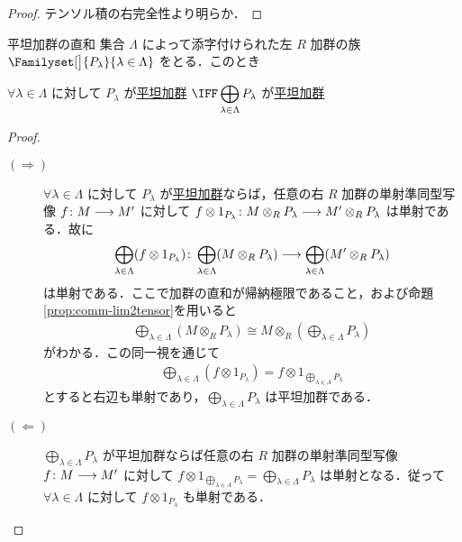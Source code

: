 \documentclass[algtopo_main]{subfiles}
\begin{document}
\begin{proof}
    テンソル積の右完全性より明らか．
\end{proof}


\begin{myprop}[label=prop:flat-mod-ds]{平坦加群の直和}
    集合 $\Lambda$ によって添字付けられた左 $R$ 加群の族 $\Familyset[\big]{P_\lambda}{\lambda \in \Lambda}$ をとる．このとき
    
    $\forall \lambda \in \Lambda$ に対して $P_\lambda$ が\hyperref[def:flat-mod]{平坦加群} $\IFF\displaystyle \bigoplus_{\lambda \in \Lambda} P_\lambda$ が\hyperref[def:flat-mod]{平坦加群}
\end{myprop}

\begin{proof}
    \begin{description}
        \item[\textbf{$\bm{(\Longrightarrow)}$}] $\forall \lambda \in \Lambda$ に対して $P_\lambda$ が\hyperref[def:flat-mod]{平坦加群}ならば，任意の右 $R$ 加群の単射準同型写像 $f \colon M \longrightarrow M'$ に対して $f \otimes 1_{P_\lambda} \colon M \otimes_R P_\lambda \longrightarrow M' \otimes_R P_\lambda$ は単射である．故に
        \begin{align}
            \bigoplus_{\lambda \in \Lambda} (f \otimes 1_{P_\lambda}) \colon \bigoplus_{\lambda \in \Lambda} (M \otimes_R P_\lambda) \longrightarrow \bigoplus_{\lambda \in \Lambda} (M' \otimes_R P_\lambda)
        \end{align}
        は単射である．ここで加群の直和が帰納極限であること，および命題\ref{prop:comm-lim2tensor}を用いると
        \begin{align}
            \bigoplus_{\lambda \in \Lambda} (M \otimes_R P_\lambda) \cong M \otimes_R \left( \bigoplus_{\lambda \in \Lambda} P_\lambda \right)
        \end{align}
        がわかる．この同一視を通じて
        \begin{align}
            \bigoplus_{\lambda \in \Lambda} (f \otimes 1_{P_\lambda}) = f \otimes 1_{\bigoplus_{\lambda \in \Lambda} P_\lambda}
        \end{align}
        とすると右辺も単射であり，$\bigoplus_{\lambda \in \Lambda} P_\lambda$ は平坦加群である．
        \item[\textbf{$\bm{(\Longleftarrow)}$}] $\bigoplus_{\lambda \in \Lambda} P_\lambda$ が平坦加群ならば任意の右 $R$ 加群の単射準同型写像 $f \colon M \longrightarrow M'$ に対して $f \otimes 1_{\bigoplus_{\lambda \in \Lambda} P_\lambda} = \bigoplus_{\lambda \in \Lambda} P_\lambda$ は単射となる．従って $\forall \lambda \in \Lambda$ に対して $ f \otimes 1_{P_\lambda}$ も単射である．
    \end{description}
    
\end{proof}
\end{document}
